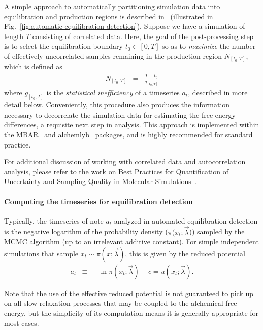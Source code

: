 \documentclass[9pt,bestpractices]{livecoms}
\begin{document}
A simple approach to automatically partitioning simulation data into equilibration and production regions is described in~\cite{chodera2016simple} (illustrated in Fig.~\ref{fig:automatic-equilibration-detection}).
Suppose we have a simulation of length $T$ consisting of correlated data.
Here, the goal of the post-processing step is to select the equilibration boundary $t_0 \in [0, T]$ so as to \emph{maximize} the number of effectively uncorrelated samples remaining in the production region $N_{[t_0,T]}$, which is defined as
\begin{eqnarray}
N_{[t_0,T]} &=& \frac{T - t_0}{g_{[t_0,T]}}
\end{eqnarray}
where $g_{[t_0,T]}$ is the \emph{statistical inefficiency} of a timeseries $a_t$, described in more detail below.
Conveniently, this procedure also produces the information necessary to decorrelate the simulation data for estimating the free energy differences, a requisite next step in analysis.
This approach is implemented within the MBAR~\cite{kylebeauchamp2019choderalab} and alchemlyb~\cite{daviddotson2019alchemistry} packages, and is highly recommended for standard practice.

For additional discussion of working with correlated data and autocorrelation analysis, please refer to the work on Best Practices for Quantification of Uncertainty and Sampling Quality in Molecular Simulations~\cite{grossfield2018best}.

\paragraph{Computing the timeseries for equilibration detection}
Typically, the timeseries of note $a_t$ analyzed in automated equilibration detection is the negative logarithm of the probability density ($\pi(x_t; \vec{\lambda}$)) sampled by the MCMC algorithm (up to an irrelevant additive constant).
For simple independent simulations that sample $x_t \sim \pi(x ; \vec{\lambda})$, this is given by the reduced potential
\begin{eqnarray}
a_t &\equiv& - \ln \pi(x_t; \vec{\lambda}) + c = u(x_t; \vec{\lambda}) .
\end{eqnarray}

Note that the use of the effective reduced potential is not guaranteed to pick up on all slow relaxation processes that may be coupled to the alchemical free energy, but the simplicity of its computation means it is generally appropriate for most cases.
\end{document}
